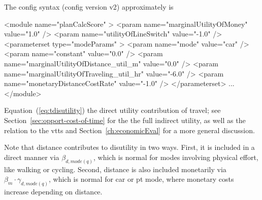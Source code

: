 %
The config syntax (config version v2) approximately is
\begin{xml}
<module name="planCalcScore" >
   <param name="marginalUtilityOfMoney" value="1.0" />
   <param name="utilityOfLineSwitch" value="-1.0" />
   <parameterset type="modeParams" >
      <param name="mode" value="car" />
      <param name="constant" value="0.0" />
      <param name="marginalUtilityOfDistance_util_m" value="0.0" />
      <param name="marginalUtilityOfTraveling_util_hr" value="-6.0" />
      <param name="monetaryDistanceCostRate" value="-1.0" />
   </parameterset>
   ...    
</module>
\end{xml}

%
Equation~(\ref{eq:tdisutility}) the direct utility contribution of travel; see Section~\ref{sec:opport-cost-of-time} for the the full indirect utility, as well as the relation to the \gls{vtts} and Section~\ref{ch:economicEval} for a more general discussion.

Note that distance contributes to disutility in two ways. First, it is included in a direct manner via $\beta_{d, mode(q)}$, which is normal for modes involving physical effort, like walking or cycling. Second, distance is also included monetarily via $\beta_m \cdot \gamma_{d, mode(q)}$, which is normal for car or pt mode, where monetary costs increase depending on distance.




